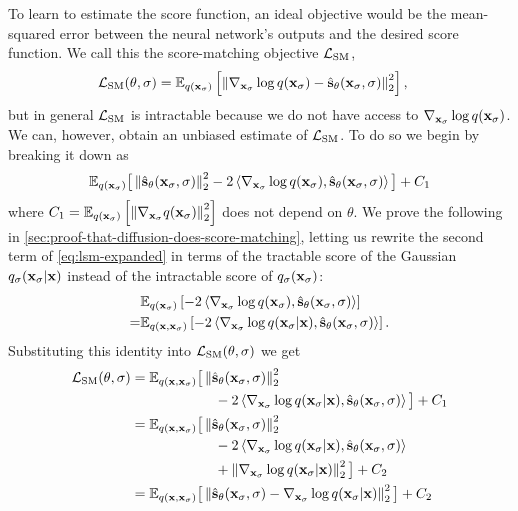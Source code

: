 To learn to estimate the score function, an ideal objective would be the mean-squared error between the neural network's outputs and the desired score function. We call this the score-matching objective ${\mathcal{L}}_\text{SM}$,
\begin{align}
    {\mathcal{L}}_\text{SM}(\theta, \sigma) &= \mathbb{E}_{q({\mathbf{x}}_\sigma)} \left[ \left\| \nabla_{{\mathbf{x}}_\sigma} \log q({\mathbf{x}}_\sigma) - \hat{{\mathbf{s}}}_\theta({\mathbf{x}}_\sigma, \sigma) \right\|_2^2 \right],
\end{align}
but in general ${\mathcal{L}}_\text{SM}$ is intractable because we do not have access to $\nabla_{{\mathbf{x}}_\sigma} \log q({\mathbf{x}}_\sigma)$. We can, however, obtain an unbiased estimate of ${\mathcal{L}}_\text{SM}$. To do so we begin by breaking it down as
\begin{align} \label{eq:lsm-expanded}
    \mathbb{E}_{q({\mathbf{x}}_\sigma)} \big[ 
    \left\| \hat{{\mathbf{s}}}_\theta({\mathbf{x}}_\sigma, \sigma) \right\|_2^2
    - 2 \left\langle \nabla_{{\mathbf{x}}_\sigma} \log q({\mathbf{x}}_\sigma),
    \hat{{\mathbf{s}}}_\theta({\mathbf{x}}_\sigma, \sigma) \right\rangle \big]
    + C_1
\end{align}
where $C_1 = \mathbb{E}_{q({\mathbf{x}}_\sigma)} \left[ \left\| \nabla_{{\mathbf{x}}_\sigma} q({\mathbf{x}}_\sigma) \right\|_2^2 \right]$ does not depend on $\theta$. We prove the following in \cref{sec:proof-that-diffusion-does-score-matching}, letting us rewrite the second term of \cref{eq:lsm-expanded} in terms of the tractable score of the Gaussian $q_{\sigma}({\mathbf{x}}_\sigma|{\mathbf{x}})$ instead of the intractable score of $q_{\sigma}({\mathbf{x}}_\sigma)$:
\begin{align}
\allowdisplaybreaks
    &\EX_{q(\rvx_\sigma)} \left[ - 2 \left\langle \nabla_{\rvx_\sigma} \log q(\rvx_\sigma), \preds_\theta(\rvx_\sigma, \sigma) \right\rangle \right] \\
    =& \EX_{q(\rvx, \rvx_\sigma)} \left[ -2 \left\langle \nabla_{\rvx_\sigma} \log q(\rvx_\sigma|\rvx), \preds_\theta(\rvx_\sigma, \sigma) \right\rangle  \right]. \nonumber
\end{align}
Substituting this identity into ${\mathcal{L}}_\text{SM}(\theta, \sigma)$ we get
\begin{align}
    {\mathcal{L}}_\text{SM}(\theta, \sigma) &= \mathbb{E}_{q({\mathbf{x}}, {\mathbf{x}}_\sigma)} \big[ 
    \left\| \hat{{\mathbf{s}}}_\theta({\mathbf{x}}_\sigma, \sigma) \right\|_2^2
    \\ &\qquad\qquad\qquad\nonumber
    - 2 \left\langle \nabla_{{\mathbf{x}}_\sigma} \log q({\mathbf{x}}_\sigma|{\mathbf{x}}), \hat{{\mathbf{s}}}_\theta({\mathbf{x}}_\sigma, \sigma) \right\rangle \big] + C_1 \\
    &= \mathbb{E}_{q({\mathbf{x}}, {\mathbf{x}}_\sigma)} \big[ 
    \left\| \hat{{\mathbf{s}}}_\theta({\mathbf{x}}_\sigma, \sigma) \right\|_2^2
    \\ &\qquad\qquad\qquad
    - 2 \left\langle \nabla_{{\mathbf{x}}_\sigma} \log q({\mathbf{x}}_\sigma|{\mathbf{x}}), \hat{{\mathbf{s}}}_\theta({\mathbf{x}}_\sigma, \sigma) \right\rangle
    \nonumber\\ &\qquad\qquad\qquad
    + \left\| \nabla_{{\mathbf{x}}_\sigma} \log q({\mathbf{x}}_\sigma|{\mathbf{x}}) \right\|_2^2 \big] + C_2 \nonumber \\
    &= \mathbb{E}_{q({\mathbf{x}}, {\mathbf{x}}_\sigma)} \big[ 
    \left\| \hat{{\mathbf{s}}}_\theta({\mathbf{x}}_\sigma, \sigma) - \nabla_{{\mathbf{x}}_\sigma} \log q({\mathbf{x}}_\sigma|{\mathbf{x}}) \right\|_2^2 \big] + C_2
\end{align}
